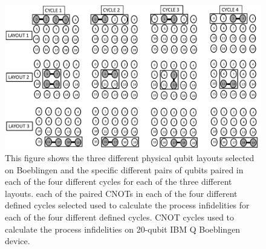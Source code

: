 



\begin{figure}[ht!]
    \includegraphics[scale=0.5]{Cycle-Layout.pdf}
    \caption{This figure shows the three different physical qubit layouts selected on Boeblingen and the specific different pairs of qubits paired in each of the four different cycles for each of the three different layouts.  each of the paired CNOTs in each of the four different defined cycles selected  used to calculate the process infidelities for each of the four different defined cycles. CNOT cycles used to calculate the process infidelities on 20-qubit IBM Q Boeblingen device.}
   \label{fig:BoeblingenCycles}
\end{figure}





